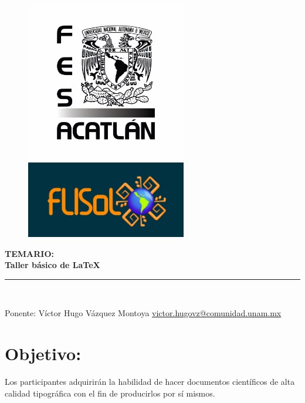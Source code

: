 \documentclass[12pt]{article}
\begin{document}
\hypersetup{pageanchor=false}
\begin{titlepage}
\begin{center}
\vspace{2cm}
\begin{figure}[H]
\begin{center}
\includegraphics[width=7cm]{logo_fes.png}\\
\includegraphics[width=7cm]{Flisol.png}
\end{center}
\end{figure}
\Huge{\textbf{TEMARIO:}}\\
\Huge{\textbf{Taller básico de \LaTeX}}
\rule{100mm}{0.1mm}\\
\begin{Large}
Ponente: Víctor Hugo Vázquez Montoya
\href{mailto:victor.hugovz@comunidad.unam.mx}{victor.hugovz@comunidad.unam.mx} 
\end{Large}
\vspace{2cm}
\end{center}
\end{titlepage}
\hypersetup{pageanchor=true}
\section*{Objetivo:}
Los participantes adquirirán la habilidad de hacer documentos científicos de alta calidad tipográfica con el fin de producirlos 
por sí mismos.
\end{document}
